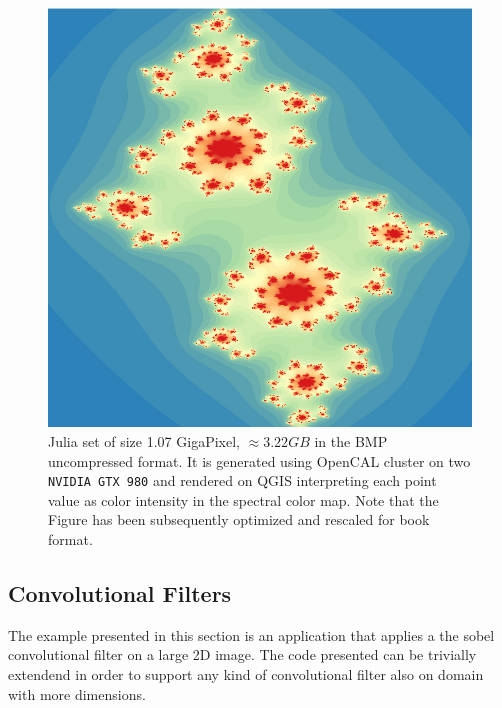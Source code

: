  \begin{figure}[H]
	\begin{center}
		\includegraphics[scale=0.35]{./images/opencal/fractal16k16k}
		\caption{Julia set of size 1.07 GigaPixel, $\approx 3.22 GB$ in the BMP uncompressed format. It is generated using OpenCAL cluster on two \texttt{NVIDIA GTX 980} and rendered on QGIS \cite{QGIS_software} interpreting each point value as color intensity in the spectral color map. Note that the Figure has been subsequently optimized and rescaled for book format.}
		\label{fig:fractal16k16k}
	\end{center}
\end{figure}

\subsection{Convolutional Filters}
\label{sec:convolutional_filters}
The example presented in this section is an application that applies a the sobel convolutional filter on a large 2D image. The code presented can be trivially extendend in order to support any kind of convolutional filter also on domain with more dimensions.

